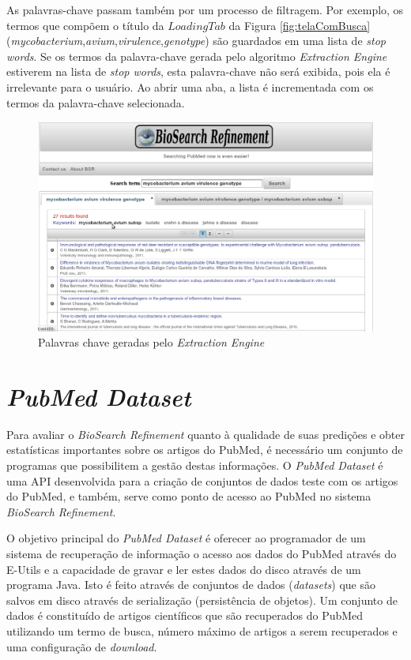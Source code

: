 As palavras-chave passam também por um processo de filtragem. Por exemplo, os termos que compõem o título da $LoadingTab$ da Figura \ref{fig:telaComBusca} (\emph{mycobacterium},\emph{avium},\emph{virulence},\emph{genotype}) são guardados em uma lista de \emph{stop words}. Se os termos da palavra-chave gerada pelo algoritmo \emph{Extraction Engine} estiverem na lista de \emph{stop words}, esta palavra-chave não será exibida, pois ela é irrelevante para o usuário. Ao abrir uma aba, a lista é incrementada com os termos da palavra-chave selecionada.

\begin{figure}[h!]
    \center
    \includegraphics[scale=0.37]{imagens/telaComKwdsEAba.png}
    \caption{Palavras chave geradas pelo \emph{Extraction Engine} \label{fig:palavrasChave}} 
\end{figure}

\section{\emph{PubMed Dataset}}

Para avaliar o \emph{BioSearch Refinement} quanto à qualidade de suas predições e obter estatísticas importantes sobre os artigos do PubMed, é necessário um conjunto de programas que possibilitem a gestão destas informações. O \emph{PubMed Dataset} é uma API desenvolvida para a criação de conjuntos de dados teste com os artigos do PubMed, e também, serve como ponto de acesso ao PubMed no sistema \emph{BioSearch Refinement}. 

O objetivo principal do \emph{PubMed Dataset} é oferecer ao programador de um sistema de recuperação de informação o acesso aos dados do PubMed através do E-Utils \cite{Eutils2010} e a capacidade de gravar e ler estes dados do disco através de um programa Java. Isto é feito através de conjuntos de dados (\emph{datasets}) que são salvos em disco através de serialização (persistência de objetos). Um conjunto de dados é constituído de artigos científicos que são recuperados do PubMed utilizando um termo de busca, número máximo de artigos a serem recuperados e uma configuração de \emph{download}.

